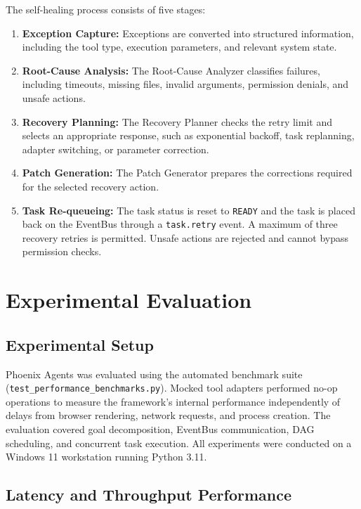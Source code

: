 \documentclass[conference]{IEEEtran}
\begin{document}
The self-healing process consists of five stages:

\begin{enumerate}
    \item \textbf{Exception Capture:} Exceptions are converted into structured information, including the tool type, execution parameters, and relevant system state.
    \item \textbf{Root-Cause Analysis:} The Root-Cause Analyzer classifies failures, including timeouts, missing files, invalid arguments, permission denials, and unsafe actions.
    \item \textbf{Recovery Planning:} The Recovery Planner checks the retry limit and selects an appropriate response, such as exponential backoff, task replanning, adapter switching, or parameter correction.
    \item \textbf{Patch Generation:} The Patch Generator prepares the corrections required for the selected recovery action.
    \item \textbf{Task Re-queueing:} The task status is reset to \texttt{READY} and the task is placed back on the EventBus through a \texttt{task.retry} event. A maximum of three recovery retries is permitted. Unsafe actions are rejected and cannot bypass permission checks.
\end{enumerate}

\section{Experimental Evaluation}

\subsection{Experimental Setup}

Phoenix Agents was evaluated using the automated benchmark suite
(\texttt{test\_performance\_benchmarks.py}). Mocked tool adapters
performed no-op operations to measure the framework's internal
performance independently of delays from browser rendering, network
requests, and process creation. The evaluation covered goal
decomposition, EventBus communication, DAG scheduling, and concurrent
task execution. All experiments were conducted on a Windows 11
workstation running Python 3.11.

\subsection{Latency and Throughput Performance}
\end{document}
